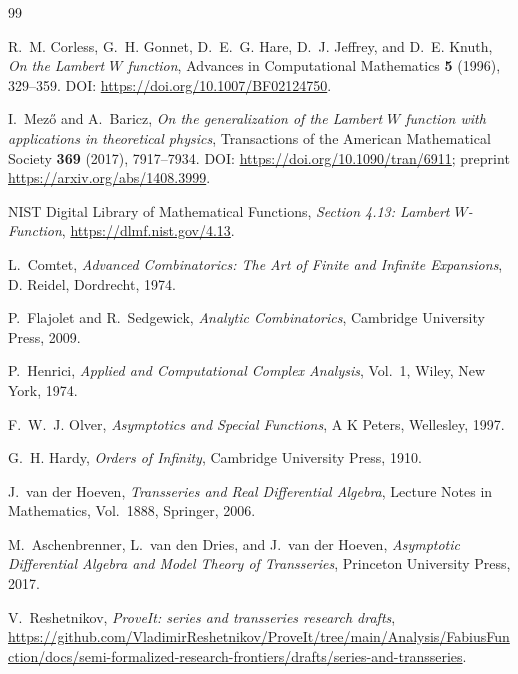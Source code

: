 \documentclass[11pt,oneside]{article}
\theoremstyle{plain}
\theoremstyle{definition}
\theoremstyle{remark}
\begin{document}
\begin{thebibliography}{99}

R.~M. Corless, G.~H. Gonnet, D.~E.~G. Hare, D.~J. Jeffrey, and D.~E. Knuth,
\emph{On the Lambert \(W\) function},
Advances in Computational Mathematics \textbf{5} (1996), 329--359.
\newblock DOI: \url{https://doi.org/10.1007/BF02124750}.

I.~Mez\H{o} and A.~Baricz,
\emph{On the generalization of the Lambert \(W\) function with applications in
theoretical physics},
Transactions of the American Mathematical Society \textbf{369} (2017),
7917--7934.
\newblock DOI: \url{https://doi.org/10.1090/tran/6911}; preprint
\url{https://arxiv.org/abs/1408.3999}.

NIST Digital Library of Mathematical Functions,
\emph{Section 4.13: Lambert \(W\)-Function},
\url{https://dlmf.nist.gov/4.13}.

L.~Comtet,
\emph{Advanced Combinatorics: The Art of Finite and Infinite Expansions},
D. Reidel, Dordrecht, 1974.

P.~Flajolet and R.~Sedgewick,
\emph{Analytic Combinatorics},
Cambridge University Press, 2009.

P.~Henrici,
\emph{Applied and Computational Complex Analysis}, Vol.~1,
Wiley, New York, 1974.

F.~W.~J. Olver,
\emph{Asymptotics and Special Functions},
A K Peters, Wellesley, 1997.

G.~H. Hardy,
\emph{Orders of Infinity},
Cambridge University Press, 1910.

J.~van der Hoeven,
\emph{Transseries and Real Differential Algebra},
Lecture Notes in Mathematics, Vol.~1888, Springer, 2006.

M.~Aschenbrenner, L.~van den Dries, and J.~van der Hoeven,
\emph{Asymptotic Differential Algebra and Model Theory of Transseries},
Princeton University Press, 2017.

V.~Reshetnikov,
\emph{ProveIt: series and transseries research drafts},
\url{https://github.com/VladimirReshetnikov/ProveIt/tree/main/Analysis/FabiusFunction/docs/semi-formalized-research-frontiers/drafts/series-and-transseries}.

\end{thebibliography}
\end{document}
